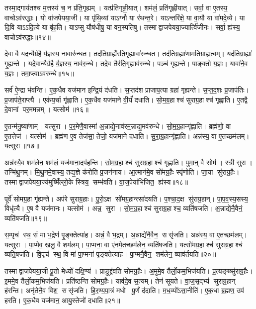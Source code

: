 तस्मा॒द्गाय॑तश्च म॒त्तस्य॑ च॒ न प्र॑ति॒गृह्यम्।
यत्प्र॑तिगृह्णी॒यात्।
शम॑लं॒ प्रति॑गृह्णीयात्।
सर्वा॒ वा ए॒तस्य॒ वाचोऽव॑रुद्धाः।
यो वा॑जपेयया॒जी।
या पृ॑थि॒व्यां याऽग्नौ या र॑थन्त॒रे।
याऽन्तरि॑क्षे॒ या वा॒यौ या वा॑मदे॒व्ये।
या दि॒वि याऽऽदि॒त्ये या बृ॑ह॒ति।
याऽप्सु यौष॑धीषु॒ या वन॒स्पति॑षु।
तस्माद्वाजपेयया॒ज्यार्त्वि॑जीनः।
सर्वा॒ ह्य॑स्य॒ वाचोऽव॑रुद्धाः॥१४॥\anuvakamend[धा॒वा॒मेति॒ ज्यैष्ठ्या॑य॒ वेद॑ ब्र॒ह्मा जा॑यते वाज॒पेय॒ सुराऽऽर्त्वि॑जीन॒ एकं॑ च]

दे॒वा वै यद॒न्यैर्ग्रहैर्य॒ज्ञस्य॒ नावारु॑न्धत।
तद॑तिग्रा॒ह्यै॑रति॒\-गृह्या\-वा॑रुन्धत।
तद॑तिग्र॒ह्या॑णामतिग्राह्य॒त्वम्।
यद॑तिग्रा॒ह्या॑ गृ॒ह्यन्ते।
यदे॒वान्यैर्ग्रहैर्य॒ज्ञस्य॒ नाव॑रु॒न्धे।
तदे॒व तैर॑ति॒गृह्या\-व॑रुन्धे।
पञ्च॑ गृह्यन्ते।
पाङ्क्तो॑ य॒ज्ञः।
यावा॑ने॒व य॒ज्ञः।
तमा॒प्त्वाऽव॑रुन्धे॥१५॥

सर्व॑ ऐ॒न्द्रा भ॑वन्ति।
ए॒क॒धैव यज॑मान इन्द्रि॒यं द॑धति।
स॒प्तद॑श प्राजाप॒त्या ग्रहा॑ गृह्यन्ते।
स॒प्त॒द॒शः प्र॒जाप॑तिः।
प्र॒जाप॑ते॒राप्त्यै।
एक॑य॒र्चा गृ॑ह्णाति।
ए॒क॒धैव यज॑माने वी॒र्यं॑ दधाति।
सो॒म॒ग्र॒हाश्च॑ सुराग्र॒हाश्च॑ गृह्णाति।
ए॒तद्वै दे॒वानां पर॒ममन्नम्।
यत्सोम॑॥१६॥

ए॒तन्म॑नु॒ष्या॑णाम्।
यत्सुरा।
प॒र॒मेणै॒वास्मा॑ अ॒न्नाद्ये॒नाव॑र\-म॒न्नाद्य॒मव॑रुन्धे।
सो॒म॒ग्र॒हान्गृ॑ह्णाति।
ब्रह्म॑णो॒ वा ए॒तत्तेज॑।
यत्सोम॑।
ब्रह्म॑ण ए॒व तेज॑सा॒ तेजो॒ यज॑माने दधाति।
सु॒रा॒ग्र॒हान्गृ॑ह्णाति।
अन्न॑स्य॒ वा ए॒तच्छम॑लम्।
यत्सुरा॥१७॥

अन्न॑स्यै॒व शम॑लेन॒ शम॑लं॒ यज॑माना॒दप॑हन्ति।
सो॒म॒ग्र॒हाश्च॑ सुराग्र॒हाश्च॑ गृह्णाति।
पुमा॒न्॒ वै सोम॑।
स्त्री सुरा।
तन्मि॑थु॒नम्।
मि॒थु॒नमे॒वास्य॒ तद्य॒ज्ञे क॑रोति प्र॒जन॑नाय।
आ॒त्मान॑मे॒व सो॑मग्र॒हैः स्पृ॑णोति।
जा॒या सु॑राग्र॒हैः।
तस्माद्वाजपेयया॒ज्य॑मुष्मिँ॑ल्लो॒के स्त्रिय॒ सम्भ॑वति।
वा॒ज॒पेया॑भिजित॒ ह्य॑स्य॥१८॥

पूर्वे॑ सोमग्र॒हा गृ॑ह्यन्ते।
अप॑रे सुराग्र॒हाः।
पु॒रो॒ऽक्ष सो॑मग्र॒हान्त्सा॑दयति।
प॒श्चा॒द॒क्ष सु॑राग्र॒हान्।
पा॒प॒व॒स्य॒सस्य॒ विधृ॑त्यै।
ए॒ष वै यज॑मानः।
यत्सोम॑।
अन्न॒ सुरा।
सो॒म॒ग्र॒हाश्च॑ सुराग्र॒हाश्च॒ व्यति॑षजति।
अ॒न्नाद्ये॑नै॒वैनं॒ व्यति॑षजति॥१९॥

स॒म्पृच॑ स्थ॒ सं मा॑ भ॒द्रेण॑ पृ॒ङ्क्तेत्या॑ह।
अन्नं॒ वै भ॒द्रम्।
अ॒न्नाद्ये॑नै॒वैन॒ ससृ॑जति।
अन्न॑स्य॒ वा ए॒तच्छम॑लम्।
यत्सुरा।
पा॒प्मेव॒ खलु॒ वै शम॑लम्।
पा॒प्मना॒ वा ए॑नमे॒तच्छम॑लेन॒ व्यति॑षजति।
यत्सो॑मग्र॒हाश्च॑ सुराग्र॒हाश्च॑ व्यति॒षज॑ति।
वि॒पृच॑ स्थ॒ वि मा॑ पा॒प्मना॑ पृ॒ङ्क्तेत्या॑ह।
पा॒प्मनै॒वैन॒ शम॑लेन॒ व्याव॑र्तयति॥२०॥

तस्माद्वाजपेयया॒जी पू॒तो मेध्यो॑ दक्षि॒ण्य॑।
प्राङुद्द्र॑वति सोमग्र॒हैः।
अ॒मुमे॒व तैर्लो॒कम॒भिज॑यति।
प्र॒त्यङ्ख्सु॑राग्र॒हैः।
इ॒ममे॒व तैर्लो॒कम॒भिज॑यति।
प्रति॑ष्ठन्ति सोमग्र॒हैः।
याव॑दे॒व स॒त्यम्।
तेन॑ सूयते।
वा॒ज॒सृद्भ्य॑ सुराग्र॒हान् ह॑रन्ति।
अनृ॑तेनै॒व विश॒ ससृ॑जति।
हि॒र॒ण्य॒पा॒त्रं मधो पू॒र्णं द॑दाति।
म॒ध॒व्यो॑ऽसा॒नीति॑।
ए॒क॒धा ब्र॒ह्मण॒ उप॑ हरति।
ए॒क॒धैव यज॑मान॒ आयु॒स्तेजो॑ दधाति॥२१॥

